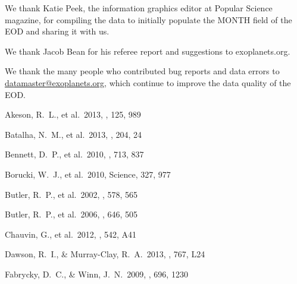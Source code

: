 \documentclass[11pt,preprint]{aastex}
\begin{document}
\begin{CJK*}{UTF8}{gbsn}
We thank Katie Peek, the information graphics editor at Popular
Science magazine, for compiling the data to initially populate the
MONTH field of the EOD and sharing it with us.

We thank Jacob Bean for his referee report and suggestions to exoplanets.org.

We thank the many people who contributed bug reports and data
errors to \url{datamaster@exoplanets.org}, which continue to improve
the data quality of the EOD.   



%
\begin{thebibliography}

 Akeson, R.~L., et al.\ 2013, 
\pasp, 125, 989 %

 Batalha, N.~M., et al.\ 2013, 
\apjs, 204, 24 %

 Bennett, D.~P., et al.\ 2010, 
\apj, 713, 837 %

 Borucki, W.~J., et al.\ 2010, 
Science, 327, 977 %

 Butler, R.~P., et al.\ 2002, 
\apj, 578, 565 %

 Butler, R.~P., et al.\ 2006, 
\apj, 646, 505 %

 Chauvin, G., et al.\ 2012, 
\aap, 542, A41 %



 Dawson, R.~I., \&
  Murray-Clay, R.~A.\ 2013, \apjl, 767, L24  %

 Fabrycky, D.~C., \&
  Winn, J.~N.\ 2009, \apj, 696, 1230 %
  

\end{thebibliography}
\end{CJK*}
\end{document}
